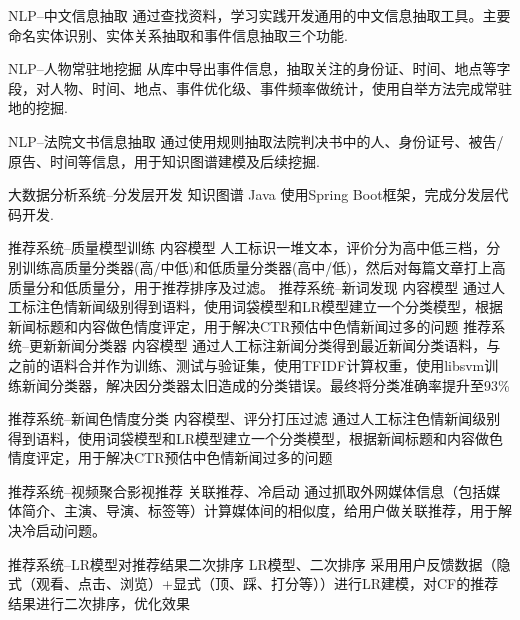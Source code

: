 \documentclass[11pt,a4paper]{moderncv}
\begin{document}
{NLP--中文信息抽取}
{}
{}{}
{通过查找资料，学习实践开发通用的中文信息抽取工具。主要命名实体识别、实体关系抽取和事件信息抽取三个功能.}

{NLP--人物常驻地挖掘}
{}
{}{}
{从库中导出事件信息，抽取关注的身份证、时间、地点等字段，对人物、时间、地点、事件优化级、事件频率做统计，使用自举方法完成常驻地的挖掘.}


{NLP--法院文书信息抽取}
{}
{}{}
{通过使用规则抽取法院判决书中的人、身份证号、被告/原告、时间等信息，用于知识图谱建模及后续挖掘.}

{大数据分析系统--分发层开发}
{知识图谱}
{Java}{}
{使用Spring Boot框架，完成分发层代码开发.}

{推荐系统--质量模型训练}
{内容模型}
{}{}
{人工标识一堆文本，评价分为高中低三档，分别训练高质量分类器(高/中低)和低质量分类器(高中/低)，然后对每篇文章打上高质量分和低质量分，用于推荐排序及过滤。}
{推荐系统--新词发现}
{内容模型}
{}{}
{通过人工标注色情新闻级别得到语料，使用词袋模型和LR模型建立一个分类模型，根据新闻标题和内容做色情度评定，用于解决CTR预估中色情新闻过多的问题}
\vspace*{0.2\baselineskip}
{推荐系统--更新新闻分类器}
{内容模型}
{}{}
{通过人工标注新闻分类得到最近新闻分类语料，与之前的语料合并作为训练、测试与验证集，使用TFIDF计算权重，使用libsvm训练新闻分类器，解决因分类器太旧造成的分类错误。最终将分类准确率提升至93\%}

\vspace*{0.2\baselineskip}
{推荐系统--新闻色情度分类}
{内容模型、评分打压过滤}
{}{}
{通过人工标注色情新闻级别得到语料，使用词袋模型和LR模型建立一个分类模型，根据新闻标题和内容做色情度评定，用于解决CTR预估中色情新闻过多的问题}

\vspace*{0.2\baselineskip}
{推荐系统--视频聚合影视推荐}
{关联推荐、冷启动}
{}{}
{通过抓取外网媒体信息（包括媒体简介、主演、导演、标签等）计算媒体间的相似度，给用户做关联推荐，用于解决冷启动问题。}

\vspace*{0.2\baselineskip}
{推荐系统--LR模型对推荐结果二次排序}
{LR模型、二次排序}
{}{}
{采用用户反馈数据（隐式（观看、点击、浏览）+显式（顶、踩、打分等））进行LR建模，对CF的推荐结果进行二次排序，优化效果}
\end{document}
